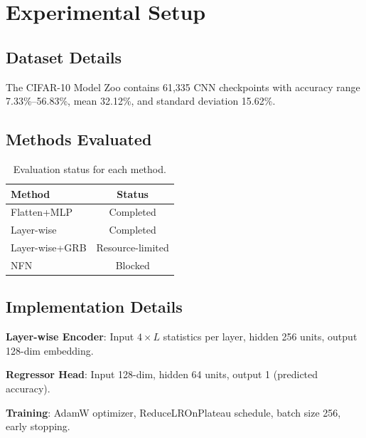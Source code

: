 \section{Experimental Setup}
\label{sec:experimental_setup}

\subsection{Dataset Details}

The CIFAR-10 Model Zoo contains 61,335 CNN checkpoints with accuracy range 7.33\%--56.83\%, mean 32.12\%, and standard deviation 15.62\%.

\subsection{Methods Evaluated}

\begin{table}[h]
\centering
\begin{tabular}{@{}lc@{}}
\toprule
Method & Status \\
\midrule
Flatten+MLP & Completed \\
Layer-wise & Completed \\
Layer-wise+GRB & Resource-limited \\
NFN & Blocked \\
\bottomrule
\end{tabular}
\caption{Evaluation status for each method.}
\label{tab:method_status}
\end{table}

\subsection{Implementation Details}

\textbf{Layer-wise Encoder}: Input $4 \times L$ statistics per layer, hidden 256 units, output 128-dim embedding.

\textbf{Regressor Head}: Input 128-dim, hidden 64 units, output 1 (predicted accuracy).

\textbf{Training}: AdamW optimizer, ReduceLROnPlateau schedule, batch size 256, early stopping.
